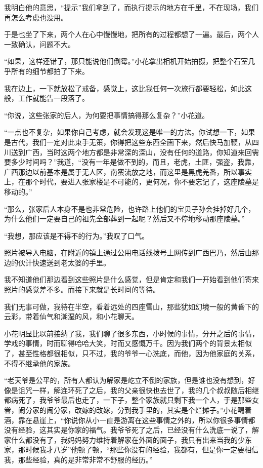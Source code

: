 我明白他的意思，“提示”我们拿到了，而执行提示的地方在千里，不在现场，我们再怎么考虑也没用。

于是也坐了下来，两个人在心中慢慢地，把所有的过程都想了一遍。最后，两个人一致确认，问题不大。

“如果，这样还错了，那只能说他们倒霉。”小花拿出相机开始拍摄，把整个石室几乎所有的细节都拍了下来。

我在边上，一下就放松了戒备，感觉上，这比我任何一次旅行都要轻松，如此这般，工作就能告一段落了。

“你说，这些张家的后人，为何要把事情搞得那么复杂？”小花道。

“一点也不复杂，如果你自己考虑，就会发现这是唯一的方法。你试想一下，如果是古代，我们一定对此束手无策，你得把这些东西全画下来，然后快马加鞭，从四川送到广西，当时这两个地方都是非常深的深山，没有任何的道路，你知道来回需要多少时间吗？”我道，“没有一年是做不到的，而且，老虎，土匪，强盗，我靠，广西那边以前基本是属于无人区，南蛮流放之地，而这里是黑虎羌番，所以事实上，在那个时代，要进入张家楼是不可能的，更何况，你不要忘记了，这座陵墓是移动的。”

“那么，张家后人本身不是也非常危险，也许路上他们的宝贝子孙会挂掉好几个，为什么他们一定要自己的祖先全部葬到一起呢？然后又不停地移动那座陵墓。”

“我想，那应该是不得不的行为。”我叹了口气。

照片被导入电脑，在附近的镇上通过公用电话线拨号上网传到广西巴乃，然后由那边的伙计快速送到老太婆的手里。

我不知道他们那边看到这些照片是什么感觉，但是肯定和我们一开始看到他们寄来照片的感觉差不多。而接下来就是长时间的等待。

我们无事可做，我待在半空，看着远处的四座雪山，那些犹如幻境一般的黄昏下的云彩，带着仙气和潮湿的风，和小花聊天。

小花明显比以前接纳了我，我们聊了很多东西，小时候的事情，分开之后的事情，学戏的事情，时而聊得哈哈大笑，时而又感慨万千。因为我们两个的背景太相似了，甚至性格都很相似，只不过，我的爷爷一心洗底，而他，因为他家庭的关系，不得不继承他的家族。

“老天爷是公平的，所有人都认为解家是屹立不倒的家族，但是谁也没有想到，好像是诅咒一样，解连环死了之后，我的父亲很快也去世了，我的几个叔叔随后相继都病死了，我爷爷最后也走了，一下子，整个家族就只剩下我一个人，于是那些女眷，闹分家的闹分家，改嫁的改嫁，分到我手里的，其实是个烂摊子。”小花喝着酒，靠在悬崖上，“你说你从小一直是游离在这些事情之外的，所以你很多事情都没有经验，这其实是你家的福气。我爷爷死了之后，已经没有什么洗底一说了，解家什么都没有了，我妈妈努力维持着解家在外面的面子，我只有出来当我的少东家，那时候我才八岁”他顿了顿，“那些你没有的经验，我都有，但是你一定要相信我，那些经验，真的是非常非常不舒服的经历。”

